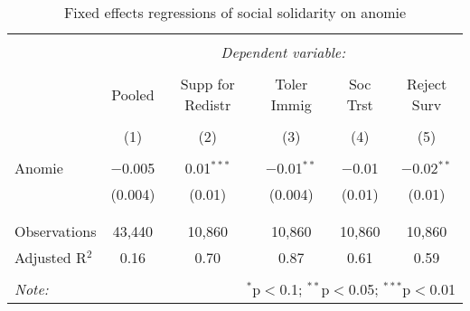
\begin{table}[!htbp] \centering 
  \caption{Fixed effects regressions of social solidarity on anomie} 
  \label{tab:soc_anomie} 
\begin{tabular}{@{\extracolsep{5pt}}lccccc} 
\\[-1.8ex]\hline 
\hline \\[-1.8ex] 
 & \multicolumn{5}{c}{\textit{Dependent variable:}} \\ 
\cline{2-6} 
\\[-1.8ex] & Pooled & Supp for Redistr & Toler Immig & Soc Trst & Reject Surv \\ 
\\[-1.8ex] & (1) & (2) & (3) & (4) & (5)\\ 
\hline \\[-1.8ex] 
 Anomie & $-$0.005 & 0.01$^{***}$ & $-$0.01$^{**}$ & $-$0.01 & $-$0.02$^{**}$ \\ 
  & (0.004) & (0.01) & (0.004) & (0.01) & (0.01) \\ 
  & & & & & \\ 
\hline \\[-1.8ex] 
Observations & 43,440 & 10,860 & 10,860 & 10,860 & 10,860 \\ 
Adjusted R$^{2}$ & 0.16 & 0.70 & 0.87 & 0.61 & 0.59 \\ 
\hline 
\hline \\[-1.8ex] 
\textit{Note:}  & \multicolumn{5}{r}{$^{*}$p$<$0.1; $^{**}$p$<$0.05; $^{***}$p$<$0.01} \\ 
\end{tabular} 
\end{table} 
